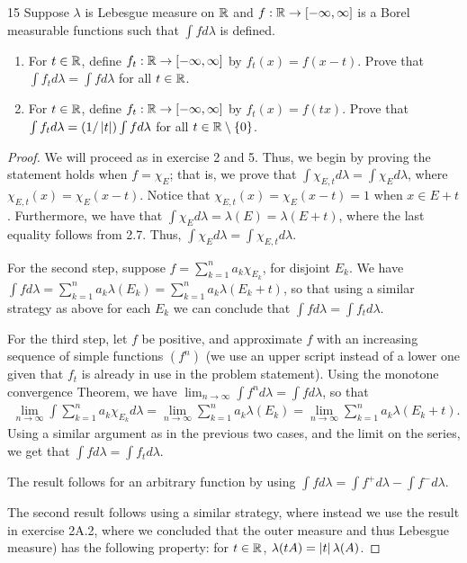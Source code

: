 \begin{exercise}{15}
Suppose $\lambda$ is Lebesgue measure on $\mathbb{R}$ and $f: \mathbb{R} \to [-\infty, \infty]$ is a Borel measurable functions such that $\int f d\lambda$ is defined.
\begin{enumerate}
    \item For $t \in \mathbb{R}$, define $f_t: \mathbb{R} \to [-\infty, \infty]$ by $f_t(x) = f(x-t)$.
    Prove that $\int f_t d\lambda = \int f d\lambda$ for all $t \in \mathbb{R}$.
    \item For $t \in \mathbb{R}$, define $f_t: \mathbb{R} \to [-\infty, \infty]$ by $f_t(x) = f(tx)$.
    Prove that $\int f_t d\lambda = (1/\left\lvert t\right\rvert) \int f d\lambda$ for all $t \in \mathbb{R} \setminus \{0\}$.
\end{enumerate}
\end{exercise}
\begin{proof}
We will proceed as in exercise 2 and 5.
Thus, we begin by proving the statement holds when $f = \chi_E$;
that is, we prove that $\int \chi_{E,t} d\lambda = \int \chi_E d\lambda$, where $\chi_{E,t}(x) = \chi_E(x-t)$.
Notice that $\chi_{E,t}(x) = \chi_E(x-t) = 1$ when $x \in E+t$.
Furthermore, we have that $\int \chi_E d\lambda = \lambda(E) = \lambda(E+t)$, where the last equality follows from 2.7.
Thus, $\int \chi_E d\lambda = \int \chi_{E,t} d\lambda$.

For the second step, suppose $f = \sum_{k = 1}^n a_k \chi_{E_k}$, for disjoint $E_k$.
We have $\int f d\lambda = \sum_{k = 1}^n a_k \lambda(E_k) = \sum_{k = 1}^n a_k\lambda(E_k + t)$, so that using a similar strategy as above for each $E_k$ we can conclude that $\int f d\lambda = \int f_t d\lambda$.

For the third step, let $f$ be positive, and approximate $f$ with an increasing sequence of simple functions $(f^n)$ (we use an upper script instead of a lower one given that $f_t$ is already in use in the problem statement).
Using the monotone convergence Theorem, we have $\lim_{n \to \infty} \int f^n d\lambda = \int f d\lambda$, so that 
\begin{align*}
    \lim_{n \to \infty} \int \sum_{k = 1}^n a_k\chi_{E_k} d\lambda
    = \lim_{n \to \infty} \sum_{k = 1}^n a_k \lambda(E_k) 
    = \lim_{n \to \infty} \sum_{k = 1}^n a_k \lambda(E_k + t).
\end{align*}
Using a similar argument as in the previous two cases, and the limit on the series, we get that $\int f d\lambda = \int f_t d\lambda$.

The result follows for an arbitrary function by using $\int f d\lambda = \int f^+ d\lambda - \int f^- d\lambda$.

The second result follows using a similar strategy, where instead we use the result in exercise 2A.2, where we concluded that the outer measure and thus Lebesgue measure) has the following property: for $t \in \mathbb{R}$, $\lambda(tA) = \left\lvert t\right\rvert \lambda(A)$.
\end{proof} 

